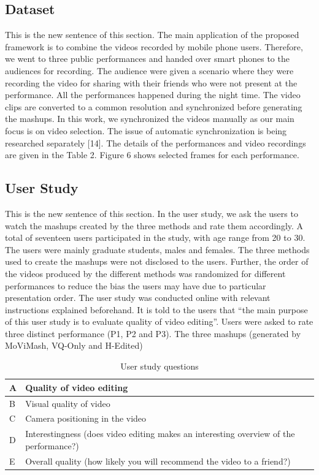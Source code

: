 \documentclass{sig-alternate}
\begin{document}
{{{\subsection{Dataset}
This is the new sentence of this section.
The main application of the proposed framework is to combine
the videos recorded by mobile phone users. Therefore, we went to
three public performances and handed over smart phones to the audiences
for recording. The audience were given a scenario where
they were recording the video for sharing with their friends who
were not present at the performance. All the performances happened
during the night time. The video clips are converted to a
common resolution and synchronized before generating the mashups.
In this work, we synchronized the videos manually as our main focus
is on video selection. The issue of automatic synchronization is
being researched separately [14]. The details of the performances
and video recordings are given in the Table 2. Figure 6 shows selected
frames for each performance.
\subsection{User Study}
This is the new sentence of this section.
In the user study, we ask the users to watch the mashups created
by the three methods and rate them accordingly. A total of seventeen
users participated in the study, with age range from 20 to 30.
The users were mainly graduate students, males and females. The
three methods used to create the mashups were not disclosed to the
users. Further, the order of the videos produced by the different
methods was randomized for different performances to reduce the
bias the users may have due to particular presentation order.
The user study was conducted online with relevant instructions
explained beforehand. It is told to the users that “the main purpose
of this user study is to evaluate quality of video editing”. Users
were asked to rate three distinct performance (P1, P2 and P3). The
three mashups (generated by MoViMash, VQ-Only and H-Edited)


\begin{table}
\centering
\caption{User study questions}
\begin{tabular}{l|l} \hline
 A & Quality of video editing\\ \hline
B &Visual quality of video\\ \hline
C &Camera positioning in the video\\ \hline
D &Interestingness (does video editing makes
an interesting
overview of the performance?)\\ \hline
E &Overall quality (how likely you will 
recommend the video to
a friend?)
\end{tabular}
\end{table}

}}}
\end{document}
